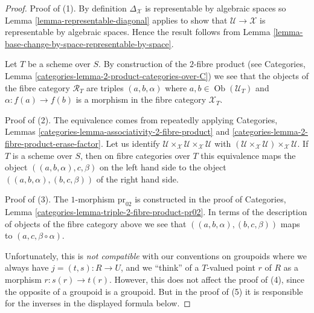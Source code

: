 \documentclass{stacks-project}
\theoremstyle{plain}
\theoremstyle{definition}
\theoremstyle{remark}
\numberwithin{equation}{subsection}
\def\Ob{\mathop{\mathrm{Ob}}\nolimits}
\begin{document}
\begin{proof}
Proof of (1). By definition $\Delta_\mathcal{X}$ is representable
by algebraic spaces so
Lemma \ref{lemma-representable-diagonal}
applies to show that $\mathcal{U} \to \mathcal{X}$ is representable
by algebraic spaces. Hence the result follows from
Lemma \ref{lemma-base-change-by-space-representable-by-space}.

\medskip\noindent
Let $T$ be a scheme over $S$. By construction of the $2$-fibre product (see
Categories, Lemma \ref{categories-lemma-2-product-categories-over-C})
we see that the objects of the fibre category $\mathcal{R}_T$
are triples $(a, b, \alpha)$ where $a, b \in \Ob(\mathcal{U}_T)$
and $\alpha : f(a) \to f(b)$
is a morphism in the fibre category $\mathcal{X}_T$.

\medskip\noindent
Proof of (2). The equivalence comes from repeatedly applying
Categories, Lemmas \ref{categories-lemma-associativity-2-fibre-product} and
\ref{categories-lemma-2-fibre-product-erase-factor}.
Let us identify
$\mathcal{U} \times_\mathcal{X} \mathcal{U} \times_\mathcal{X} \mathcal{U}$
with
$(\mathcal{U} \times_\mathcal{X} \mathcal{U})
\times_\mathcal{X} \mathcal{U}$.
If $T$ is a scheme over $S$, then on fibre categories over $T$
this equivalence maps the object
$((a, b, \alpha), c, \beta)$ on the left hand side
to the object $((a, b, \alpha), (b, c, \beta))$ of the right hand side.

\medskip\noindent
Proof of (3). The $1$-morphism $\text{pr}_{02}$ is constructed in the proof of
Categories, Lemma \ref{categories-lemma-triple-2-fibre-product-pr02}.
In terms of the description of objects of the fibre category
above we see that $((a, b, \alpha), (b, c, \beta))$
maps to $(a, c, \beta \circ \alpha)$.

\medskip\noindent
Unfortunately, this is {\it not compatible} with our conventions on
groupoids where we always have $j = (t, s) : R \to U$, and we ``think''
of a $T$-valued point $r$ of $R$ as a morphism $r : s(r) \to t(r)$.
However, this does not affect the proof of (4), since the opposite of
a groupoid is a groupoid. But in the proof of (5) it is responsible
for the inverses in the displayed formula below.


\end{proof}
\end{document}
